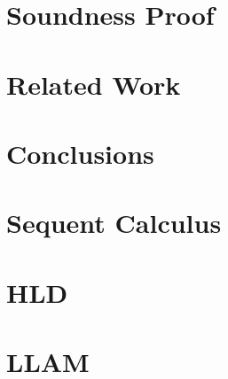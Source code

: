 \documentclass{llncs}
\begin{document}
\section{Soundness Proof}\label{sec:soundness}


\section{Related Work}


\section{Conclusions}





\clearpage
\appendix
\section{Sequent Calculus}

\section{HLD}


\section{LLAM}

\end{document}

